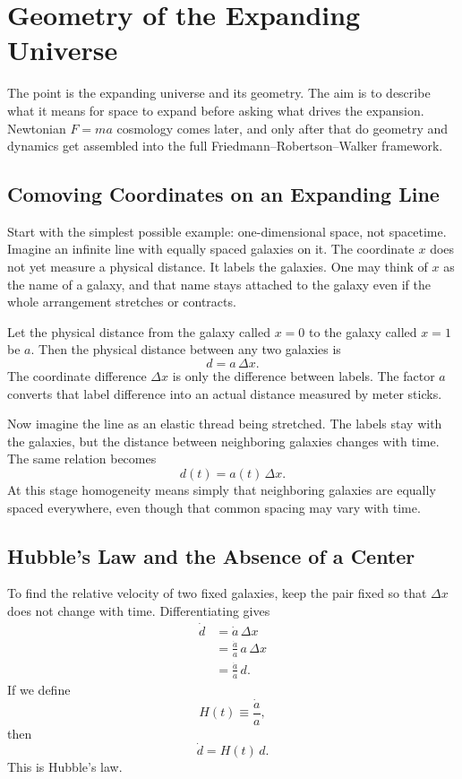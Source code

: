 \chapter{Geometry of the Expanding Universe}

The point is the expanding universe and its geometry. The aim is to describe what it means for space to expand before asking what drives the expansion. Newtonian \(F=ma\) cosmology comes later, and only after that do geometry and dynamics get assembled into the full Friedmann--Robertson--Walker framework.

\section{Comoving Coordinates on an Expanding Line}

Start with the simplest possible example: one-dimensional space, not spacetime. Imagine an infinite line with equally spaced galaxies on it. The coordinate \(x\) does not yet measure a physical distance. It labels the galaxies. One may think of \(x\) as the name of a galaxy, and that name stays attached to the galaxy even if the whole arrangement stretches or contracts.

Let the physical distance from the galaxy called \(x=0\) to the galaxy called \(x=1\) be \(a\). Then the physical distance between any two galaxies is
\begin{equation}
d=a\,\Delta x.
\end{equation}
The coordinate difference \(\Delta x\) is only the difference between labels. The factor \(a\) converts that label difference into an actual distance measured by meter sticks.

Now imagine the line as an elastic thread being stretched. The labels stay with the galaxies, but the distance between neighboring galaxies changes with time. The same relation becomes
\begin{equation}
d(t)=a(t)\,\Delta x.
\end{equation}
At this stage homogeneity means simply that neighboring galaxies are equally spaced everywhere, even though that common spacing may vary with time.

\section{Hubble's Law and the Absence of a Center}

To find the relative velocity of two fixed galaxies, keep the pair fixed so that \(\Delta x\) does not change with time. Differentiating gives
\begin{align}
\dot d &= \dot a\,\Delta x \\
       &= \frac{\dot a}{a}\,a\,\Delta x \\
       &= \frac{\dot a}{a}\,d.
\end{align}
If we define
\begin{equation}
H(t)\equiv \frac{\dot a}{a},
\end{equation}
then
\begin{equation}
\dot d = H(t)\,d.
\end{equation}
This is Hubble's law.

